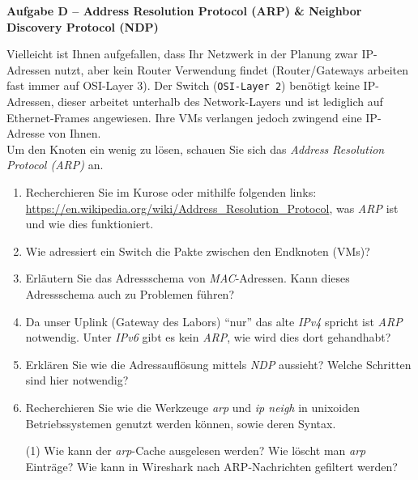 \documentclass[paper=a4,fontsize=11pt]{scrartcl}%
\numberwithin{equation}{section}
\begin{document}
\begin{center}\Large{\textbf{Aufgabe D -- Address Resolution Protocol (ARP) \& Neighbor Discovery Protocol (NDP)}}\end{center}\vskip0.25in
Vielleicht ist Ihnen aufgefallen, dass Ihr Netzwerk in der Planung zwar IP-Adressen nutzt, aber kein Router Verwendung findet (Router/Gateways arbeiten fast immer auf OSI-Layer 3). Der Switch (\texttt{OSI-Layer 2}) benötigt keine IP-Adressen, dieser arbeitet unterhalb des Network-Layers und ist lediglich auf Ethernet-Frames angewiesen. Ihre VMs verlangen jedoch zwingend eine IP-Adresse von Ihnen.\\
Um den Knoten ein wenig zu lösen, schauen Sie sich das \emph{Address Resolution Protocol (ARP)} an.
\begin{enumerate}
		\item Recherchieren Sie im Kurose \cite[S. 461ff, 465]{Kurose2012} oder mithilfe folgenden links: \url{https://en.wikipedia.org/wiki/Address_Resolution_Protocol}, was \emph{ARP} ist und wie dies funktioniert.
		\item Wie adressiert ein Switch die Pakte zwischen den Endknoten (VMs)?
		\item Erläutern Sie das Adressschema von \emph{MAC}-Adressen. Kann dieses Adressschema auch zu Problemen führen?
		\item Da unser Uplink (Gateway des Labors) \enquote{nur} das alte \emph{IPv4} spricht ist \emph{ARP} notwendig. Unter \emph{IPv6} gibt es kein \emph{ARP}, wie wird dies dort gehandhabt?
		\item Erklären Sie wie die Adressauflösung mittels \emph{NDP} aussieht? Welche Schritten sind hier notwendig?
		\item Recherchieren Sie wie die Werkzeuge \emph{arp} und \emph{ip neigh} in unixoiden Betriebssystemen genutzt werden können, sowie deren Syntax.
		\begin{tasks}(1)
			\task Wie kann der \emph{arp}-Cache ausgelesen werden?
			\task Wie löscht man \emph{arp} Einträge?
			\task Wie kann in Wireshark nach ARP-Nachrichten gefiltert werden?
		\end{tasks}
\end{enumerate}
\end{document}
